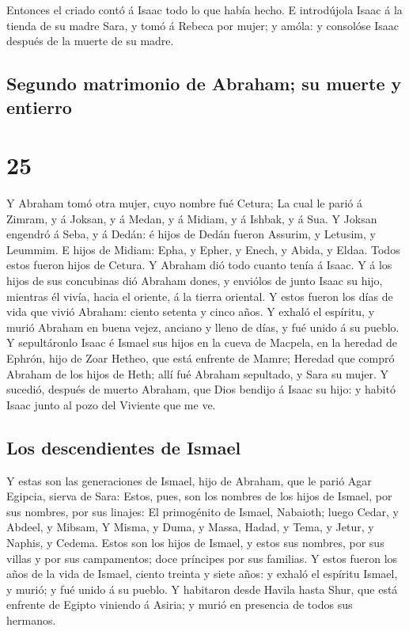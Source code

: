  Entonces el criado contó á Isaac todo lo que había
hecho.  E introdújola Isaac á la tienda de su madre Sara,
y tomó á Rebeca por mujer; y amóla: y consolóse Isaac después de la
muerte de su madre.

\hypertarget{segundo-matrimonio-de-abraham-su-muerte-y-entierro}{%
\subsection{Segundo matrimonio de Abraham; su muerte y
entierro}\label{segundo-matrimonio-de-abraham-su-muerte-y-entierro}}

\hypertarget{section-01-25}{%
\section{25}\label{section-01-25}}

 Y Abraham tomó otra mujer, cuyo nombre fué Cetura;
 La cual le parió á Zimram, y á Joksan, y á Medan, y á
Midiam, y á Ishbak, y á Sua.  Y Joksan engendró á Seba, y
á Dedán: é hijos de Dedán fueron Assurim, y Letusim, y Leummim.
 E hijos de Midiam: Epha, y Epher, y Enech, y Abida, y
Eldaa. Todos estos fueron hijos de Cetura.  Y Abraham dió
todo cuanto tenía á Isaac.  Y á los hijos de sus
concubinas dió Abraham dones, y enviólos de junto Isaac su hijo,
mientras él vivía, hacia el oriente, á la tierra oriental.
 Y estos fueron los días de vida que vivió Abraham: ciento
setenta y cinco años.  Y exhaló el espíritu, y murió
Abraham en buena vejez, anciano y lleno de días, y fué unido á su
pueblo.  Y sepultáronlo Isaac é Ismael sus hijos en la
cueva de Macpela, en la heredad de Ephrón, hijo de Zoar Hetheo, que está
enfrente de Mamre;  Heredad que compró Abraham de los
hijos de Heth; allí fué Abraham sepultado, y Sara su mujer.
 Y sucedió, después de muerto Abraham, que Dios bendijo á
Isaac su hijo: y habitó Isaac junto al pozo del Viviente que me ve.

\hypertarget{los-descendientes-de-ismael}{%
\subsection{Los descendientes de
Ismael}\label{los-descendientes-de-ismael}}

 Y estas son las generaciones de Ismael, hijo de Abraham,
que le parió Agar Egipcia, sierva de Sara:  Estos, pues,
son los nombres de los hijos de Ismael, por sus nombres, por sus
linajes: El primogénito de Ismael, Nabaioth; luego Cedar, y Abdeel, y
Mibsam,  Y Misma, y Duma, y Massa,  Hadad,
y Tema, y Jetur, y Naphis, y Cedema.  Estos son los hijos
de Ismael, y estos sus nombres, por sus villas y por sus campamentos;
doce príncipes por sus familias.  Y estos fueron los años
de la vida de Ismael, ciento treinta y siete años: y exhaló el espíritu
Ismael, y murió; y fué unido á su pueblo.  Y habitaron
desde Havila hasta Shur, que está enfrente de Egipto viniendo á Asiria;
y murió en presencia de todos sus hermanos.

